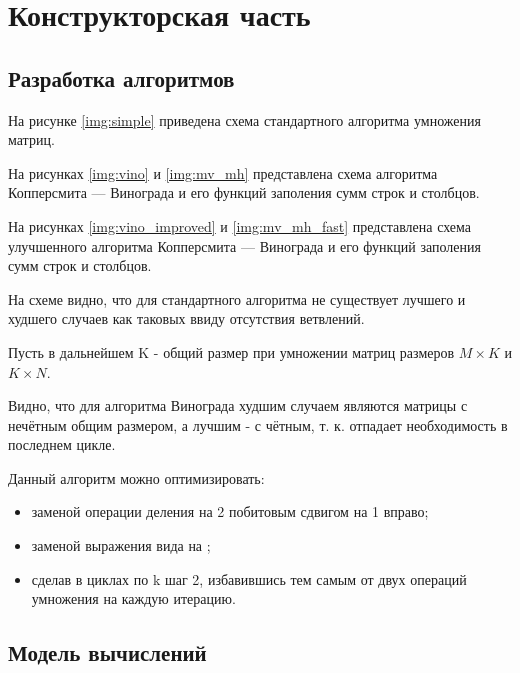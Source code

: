 \chapter{Конструкторская часть}

\section{Разработка алгоритмов}

На рисунке \ref{img:simple} приведена схема стандартного алгоритма умножения матриц.

На рисунках \ref{img:vino} и \ref{img:mv_mh} представлена схема алгоритма Копперсмита — Винограда и его функций заполения сумм строк и столбцов.

На рисунках \ref{img:vino_improved} и \ref{img:mv_mh_fast} представлена схема улучшенного алгоритма Копперсмита — Винограда и его функций заполения сумм строк и столбцов.

{}

На схеме видно, что для стандартного алгоритма не существует лучшего и худшего случаев как таковых ввиду отсутствия ветвлений.

\clearpage
{}
Пусть в дальнейшем K - общий размер при умножении матриц размеров $M \times K$ и $K \times N$.

Видно, что для алгоритма Винограда худшим случаем являются матрицы с нечётным общим размером, а лучшим - с чётным, т. к. отпадает необходимость в последнем цикле.

Данный алгоритм можно оптимизировать:
\begin{itemize}
	\item заменой операции деления на 2 побитовым сдвигом на 1 вправо;
	\item заменой выражения вида  на ;
	\item сделав в циклах по k шаг 2, избавившись тем самым от двух операций умножения на каждую итерацию.
\end{itemize}

\clearpage
{}


\section{Модель вычислений}

